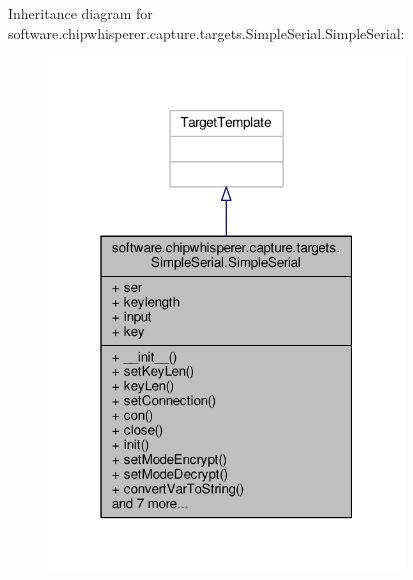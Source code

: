 Inheritance diagram for software.\+chipwhisperer.\+capture.\+targets.\+Simple\+Serial.\+Simple\+Serial\+:\nopagebreak
\begin{figure}[H]
\begin{center}
\leavevmode
\includegraphics[width=268pt]{d3/db9/classsoftware_1_1chipwhisperer_1_1capture_1_1targets_1_1SimpleSerial_1_1SimpleSerial__inherit__graph}
\end{center}
\end{figure}


